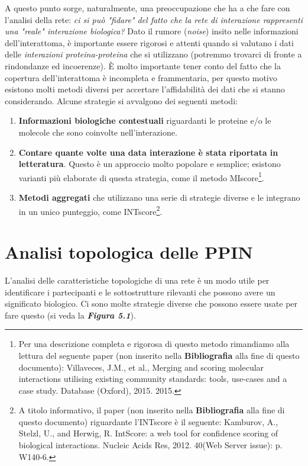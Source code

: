 \documentclass[11pt]{article}
\begin{document}
A questo punto sorge, naturalmente, una preoccupazione che ha a che fare con l'analisi della rete: \textit{ci si può "fidare" del fatto che la rete di interazione rappresenti una "reale" interazione biologica?} Dato il rumore (\textit{noise}) insito nelle informazioni dell'interattoma, è importante essere rigorosi e attenti quando si valutano i dati delle \textit{interazioni proteina-proteina} che si utilizzano (potremmo trovarci di fronte a rindondanze ed incoerenze). È molto importante tener conto del fatto che la copertura dell'interattoma è incompleta e frammentaria, per questo motivo esistono molti metodi diversi per accertare l'affidabilità dei dati che si stanno considerando. Alcune strategie si avvalgono dei seguenti metodi:
\begin{enumerate}
\item \textbf{Informazioni biologiche contestuali} riguardanti le proteine e/o le molecole che sono coinvolte nell'interazione.
\item \textbf{Contare quante volte una data interazione è stata riportata in letteratura}. Questo è un approccio molto popolare e semplice; esistono varianti più elaborate di questa strategia, come il metodo MIscore\footnote{Per una descrizione completa e rigorosa di questo metodo rimandiamo alla lettura del seguente paper (non inserito nella \textbf{Bibliografia} alla fine di questo documento): Villaveces, J.M., et al., Merging and scoring molecular interactions utilising existing community standards: tools, use-cases and a case study. Database (Oxford), 2015. 2015. }.
\item \textbf{Metodi aggregati} che utilizzano una serie di strategie diverse e le integrano in un unico punteggio, come INTscore\footnote{A titolo informativo, il paper (non inserito nella \textbf{Bibliografia} alla fine di questo documento) riguardante l'INTscore è il seguente: Kamburov, A., Stelzl, U., and Herwig, R. IntScore: a web tool for confidence scoring of biological interactions. Nucleic Acids Res, 2012. 40(Web Server issue): p. W140-6.}.
\end{enumerate}

\pagebreak
\section{Analisi topologica delle PPIN}
L'analisi delle caratteristiche topologiche di una rete è un modo utile per identificare i partecipanti e le sottostrutture rilevanti che possono avere un significato biologico. Ci sono molte strategie diverse che possono essere usate per fare questo (si veda la \textit{\textbf{Figura 5.1}}). 
\end{document}
